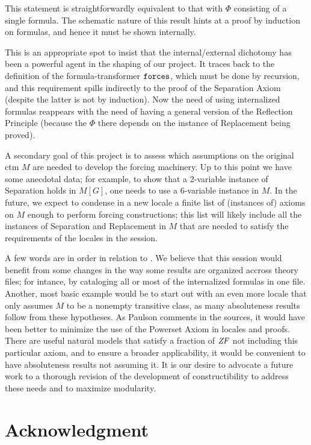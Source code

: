 This statement is straightforwardly equivalent to that with $\Phi$
consisting of a single formula. The schematic nature of this result
hints at a proof by induction on formulas, and hence it must be shown
internally. 

This  is an appropriate spot to insist that the internal/external
dichotomy has been a powerful agent in the shaping of our
project. It traces back to the definition of the formula-transformer
$\mathop{\mathtt{forces}}$, which must be done by recursion, and this requirement
spills indirectly to the proof of the Separation Axiom (despite the
latter
is not by induction). Now the need of using internalized formulas
reappears with the need of having a general version of the Reflection
Principle (because the $\Phi$ there depends on the instance of Replacement
being proved).

A secondary goal of this project is to assess which assumptions on the
original ctm $M$ are needed to develop the forcing machinery. Up to this
point we have some anecdotal data; for example, to show that a
2-variable instance of Separation holds in $M[G]$, one needs to use a
6-variable instance in $M$. In the future, we expect to condense in a
new locale a finite list of (instances of) axioms on $M$ enough to
perform forcing constructions; this list will likely include all the
instances of Separation and Replacement in $M$ that are needed to
satisfy the requirements of the locales in the
 session.  

A few words are in order in relation to .
We believe that this  session  would benefit from some changes in
the way some results are organized accross theory files; for
intance, by cataloging all or most of the internalized formulas in one
file. Another, most basic example would be to start out with an even
more locale that only assumes $M$ to be a nonempty transitive class,
as many absoluteness results follow from these hypotheses.
As Paulson comments in the sources, it would have been better to
minimize the use of the Powerset Axiom in locales and proofs. There
are  useful natural models that satisfy a fraction of $\mathit{ZF}$ not including
this particular axiom, and to ensure a broader applicability, it would
be convenient to have  absoluteness results not assuming it.
It is our desire to advocate a future work to a thorough
revision of the development of constructibility to address these needs
and to maximize modularity.


\section*{Acknowledgment}


